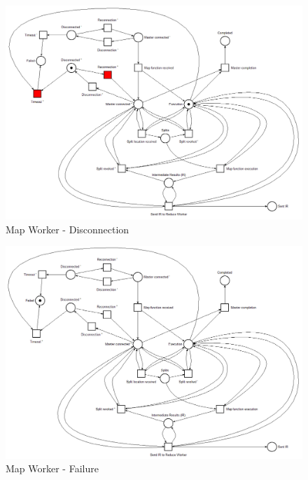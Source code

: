 \begin{figure}[!ht]
    \centering
    \includegraphics[width=\linewidth]{document/chapters/chapter_6/images/map_worker_petri_net_3.png}
    \caption{Map Worker - Disconnection}
    \label{fig:map_worker_petri_net_3}
\end{figure}

\begin{figure}[!ht]
    \centering
    \includegraphics[width=\linewidth]{document/chapters/chapter_6/images/map_worker_petri_net_4.png}
    \caption{Map Worker - Failure}
    \label{fig:map_worker_petri_net_4}
\end{figure}

